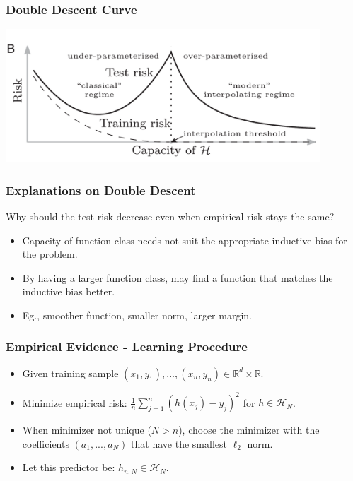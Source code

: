 \documentclass{beamer}
\begin{document}
\begin{frame}
\frametitle{Double Descent Curve}
\includegraphics[height=5cm]{Double-Descent-Curve.png}
\end{frame}

\begin{frame}
\frametitle{Explanations on Double Descent}
Why should the test risk decrease even when empirical risk stays the same?\\
\begin{itemize}[itemsep = 12pt]
\item Capacity of function class needs not suit the appropriate inductive bias for the problem.
\item By having a larger function class, may find a function that matches the inductive bias better.
\item Eg., smoother function, smaller norm, larger margin.
\end{itemize}

\end{frame}

\begin{frame}
\frametitle{Empirical Evidence - Learning Procedure}
\begin{itemize}[itemsep = 12pt]
	\item Given training sample $(x_1, y_1), ..., (x_n, y_n) \in \mathbb{R}^d \times \mathbb{R}$.
	\item Minimize empirical risk: $\frac{1}{n}\sum_{j=1}^{n}(h(x_j)-y_j)^2$ for $h \in \mathcal{H}_N$.
	\item When minimizer not unique ($N > n$), choose the minimizer with the coefficients $(a_1, ..., a_N)$ that have the smallest $\ell_2$ norm.
	\item Let this predictor be: $h_{n,N} \in \mathcal{H}_N$.
\end{itemize}
\end{frame}
\end{document}

